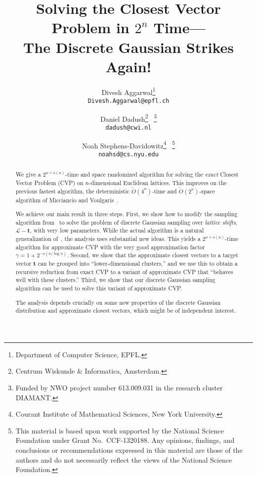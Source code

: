 \documentclass[11pt]{article}
\renewcommand{\vec}[1]{\ensuremath{\mathbf{#1}}}
\newcommand{\problem}[1]{\mbox{#1}\xspace}
\newcommand{\scarequotes}[1]{``#1''}
\newcommand{\lat}{\mathcal{L}}
\begin{document}
\title{Solving the
Closest Vector Problem in $2^n$ Time---\\
The Discrete Gaussian Strikes Again!} 

\author{
Divesh Aggarwal\thanks{Department of Computer Science, EPFL.}\\
\texttt{Divesh.Aggarwal@epfl.ch}
\and
Daniel Dadush\thanks{Centrum Wiskunde \& Informatica, Amsterdam.}
~\thanks{Funded by NWO project number 613.009.031 in the research cluster DIAMANT.}\\
\texttt{dadush@cwi.nl}
\and
Noah Stephens-Davidowitz\thanks{Courant Institute of Mathematical Sciences, New York
 University.}
~\thanks{This material is based upon work supported by the National Science Foundation under Grant No.~CCF-1320188. Any opinions, findings, and conclusions or recommendations expressed in this material are those of the authors and do not necessarily reflect the views of the National Science Foundation.}\\
\texttt{noahsd@cs.nyu.edu}
}
\date{}
\maketitle

\begin{abstract}
We give a $2^{n+o(n)}$-time and space randomized algorithm for solving the {\em exact}
Closest Vector Problem (\problem{CVP}) on $n$-dimensional Euclidean lattices.  This
improves on the previous fastest algorithm, the deterministic $\widetilde{O}(4^{n})$-time and $\widetilde{O}(2^{n})$-space algorithm of Micciancio and Voulgaris~\cite{MV13}.

We achieve our main result in three steps. First, we show how to modify the sampling algorithm from~\cite{ADRS15} to solve the problem of discrete Gaussian sampling over \emph{lattice shifts}, $\lat - \vec{t}$, with very low parameters. While the actual algorithm is a natural generalization of~\cite{ADRS15}, the analysis uses substantial new ideas. This yields a $2^{n+o(n)}$-time algorithm for approximate \problem{CVP} with the very good approximation factor $\gamma = 1+2^{-o(n/\log n)}$.  
Second, we show that the approximate closest vectors to a target vector $\vec{t}$ can be grouped into \scarequotes{lower-dimensional clusters,} and we use this to obtain a recursive reduction from exact CVP to a variant of approximate CVP that \scarequotes{behaves well with these clusters.} 
Third, we show that our discrete Gaussian sampling algorithm can be used to solve this variant of approximate CVP.

The analysis depends crucially on some new properties of the discrete Gaussian distribution and approximate closest vectors, which might be of independent interest.
\end{abstract}
\end{document}
